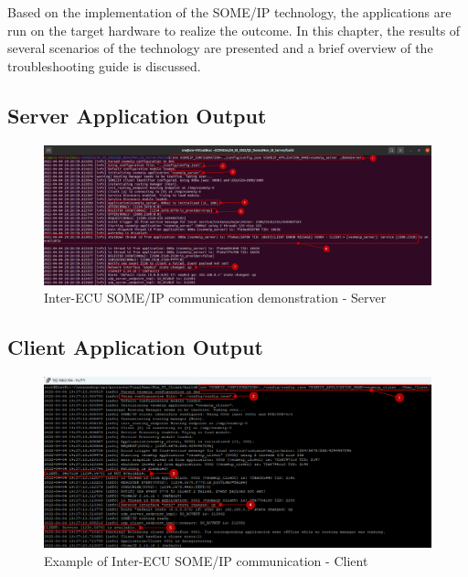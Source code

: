 Based on the implementation of the SOME/IP technology, the applications are run on the target hardware to realize the outcome. In this chapter, the results of several scenarios of the technology are presented and a brief overview of the troubleshooting guide is discussed.

\subsection{Server Application Output}
\begin{figure}[!htb]
	\centering
		\includegraphics[width=1\textwidth]{images/res_server_eth0.png}
	\caption{Inter-ECU SOME/IP communication demonstration - Server}
	\label{fig:res_server_eth0}
\end{figure}


\subsection{Client Application Output}
\begin{figure}[!htb]
	\centering
		\includegraphics[width=1\textwidth]{images/res_client_eth0.png}
	\caption{Example of Inter-ECU SOME/IP communication - Client}
	\label{fig:res_client_eth0}
\end{figure}



